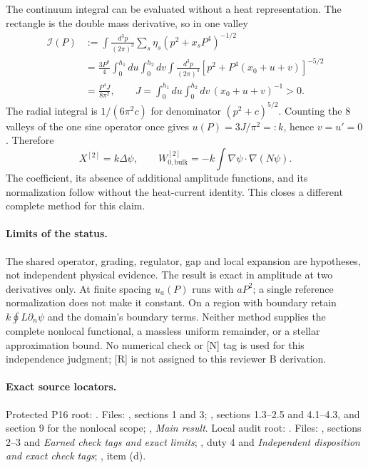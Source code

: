The continuum integral can be evaluated without a heat representation.
The rectangle is the double mass derivative, so in one valley
\[
 \begin{aligned}
 \mathcal I(P)&:=\int\frac{d^3p}{(2\pi)^3}
       \sum_s\eta_s(p^2+x_sP^4)^{-1/2}\\
 &=\frac{3P^8}{4}\int_0^{h_1}\!du\int_0^{h_2}\!dv
   \int\frac{d^3p}{(2\pi)^3}
       [p^2+P^4(x_0+u+v)]^{-5/2}\\
 &=\frac{P^4J}{8\pi^2},\qquad
 J=\int_0^{h_1}\!du\int_0^{h_2}\!dv\,
       (x_0+u+v)^{-1}>0 .
 \end{aligned}
\]
The radial integral is $1/(6\pi^2c)$ for denominator
$(p^2+c)^{5/2}$.  Counting the 8 valleys of the one sine operator
once gives $u(P)=3J/\pi^2=:k$, hence $v=u'=0$.  Therefore
\[
 X^{[2]}=k\Delta\psi,\qquad
 W_{0,\mathrm{bulk}}^{[2]}
   =-k\int\nabla\psi\cdot\nabla(N\psi).
\]
The coefficient, its absence of additional amplitude functions, and
its normalization follow without the heat-current identity.
This closes a different complete method for this claim.

\paragraph*{Limits of the status.}
The shared operator, grading, regulator, gap and local expansion are
hypotheses, not independent physical evidence.  The result is exact
in amplitude at two derivatives only.  At finite spacing $u_a(P)$
runs with $aP^2$; a single reference normalization does not make it
constant.  On a region with boundary retain
$k\oint L\partial_n\psi$ and the domain's boundary terms.
Neither method supplies the complete nonlocal functional, a
massless uniform remainder, or a stellar approximation bound.
No numerical check or [N] tag is used for this independence judgment;
[R] is not assigned to this reviewer B derivation.

\paragraph*{Exact source locators.}
\begingroup\footnotesize
Protected P16 root:
.
Files: , sections 1 and 3;
, sections 1.3--2.5
and 4.1--4.3, and section 9 for the nonlocal scope;
, \emph{Main result}.
Local audit root:
.
Files: , sections 2--3
and \emph{Earned check tags and exact limits};
, duty 4 and
\emph{Independent disposition and exact check tags};
, item (d).
\endgroup
